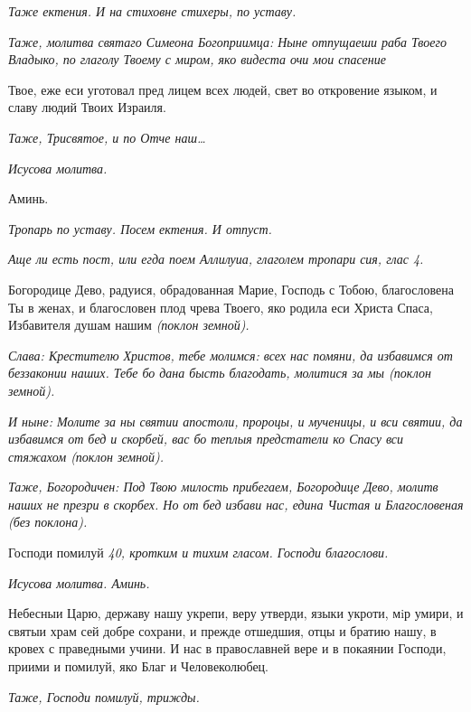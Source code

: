  \itshape Таже ектения. И на стиховне стихеры, по уставу.\normalfont{}


 \itshape Таже, молитва святаго Симеона Богоприимца:\normalfont{} Ныне отпущаеши раба
Твоего Владыко, по глаголу Твоему с миром, яко видеста очи мои спасение

Твое, еже еси уготовал пред лицем всех людей, свет во откровение языком, и
славу людий Твоих Израиля.


 \itshape Таже,\normalfont{} \itshape Трисвятое\normalfont{}, \itshape и по\normalfont{} Отче наш…


 \itshape Исусова молитва.\normalfont{}


   Аминь.


 \itshape Тропарь по уставу. Посем ектения. И отпуст.\normalfont{}


 \itshape Аще ли есть пост, или егда поем Аллилуиа, глаголем тропари сия, глас
4.\normalfont{}


   Богородице Дево, радуися, обрадованная Марие, Господь с Тобою,
благословена Ты в женах, и благословен плод чрева Твоего, яко родила еси
Христа Спаса, Избавителя душам нашим \itshape (поклон земной)\normalfont{}.


 \itshape Слава:\normalfont{} Крестителю Христов, тебе молимся: всех нас помяни, да
избавимся от беззаконии наших. Тебе бо дана бысть благодать, молитися за
мы \itshape (поклон земной)\normalfont{}.


 \itshape И ныне:\normalfont{} Молите за ны святии апостоли, пророцы, и мученицы, и вси
святии, да избавимся от бед и скорбей, вас бо теплыя предстатели ко Спасу
вси стяжахом \itshape (поклон земной)\normalfont{}.


 \itshape Таже, Богородичен:\normalfont{} Под Твою милость прибегаем, Богородице Дево,
молитв наших не презри в скорбех. Но от бед избави нас, едина Чистая и
Благословеная \itshape (без поклона)\normalfont{}.


   Господи помилуй \itshape 40, кротким и тихим гласом.\normalfont{} Господи благослови.


 \itshape Исусова молитва.\normalfont{} Аминь.


   Небесныи Царю, державу нашу укрепи, веру утверди, языки укроти, мiр
умири, и святыи храм сей добре сохрани, и прежде отшедшия, отцы и
братию нашу, в кровех с праведными учини. И нас в православней вере и в
покаянии Господи, приими и помилуй, яко Благ и Человеколюбец.


 \itshape Таже,\normalfont{} Господи помилуй, \itshape трижды.\normalfont{}


